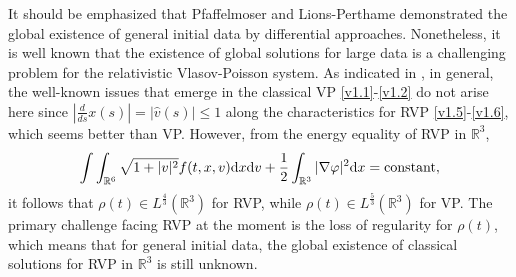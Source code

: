 \documentclass[11pt,reqno]{amsart}%
\theoremstyle{definition}
\theoremstyle{remark}
\begin{document}
%
%
It should be emphasized that  Pfaffelmoser \cite{P} and Lions-Perthame \cite{LP} demonstrated the global existence of general initial data by differential approaches. Nonetheless, it is well known that the existence of global solutions for large data is a challenging problem for the relativistic Vlasov-Poisson system. %
%
As indicated in \cite{GS}, in general, the well-known issues that emerge in the classical VP \eqref{v1.1}-\eqref{v1.2} do not arise here since $|\frac{d}{ds}x(s)|=|\hat{v}(s)|\leq 1$  along the characteristics for RVP \eqref{v1.5}-\eqref{v1.6}, which seems better than VP. However, from the energy equality of RVP in $\mathbb{R}^{3}$, 
$$ %
 \int\int_{\mathbb{R}^{6}}\sqrt{1+|v|^{2}}f(t,x,v){\rm d}x{\rm d}v+\frac{1}{2}\int_{\mathbb{R}^{3}}|\nabla \varphi|^{2}{\rm d}x=\text{constant}, \nonumber
$$%
it follows that $\rho(t)\in L^{\frac{4}{3}}(\mathbb{R}^{3})$  for RVP,  while $\rho(t)\in L^{\frac{5}{3}}(\mathbb{R}^{3})$ for VP.
The primary challenge facing RVP at the moment is the loss of regularity for $\rho(t)$, which means that for general initial data, the global existence of classical  solutions  for RVP in $\mathbb{R}^{3}$  is still unknown.
\end{document}
